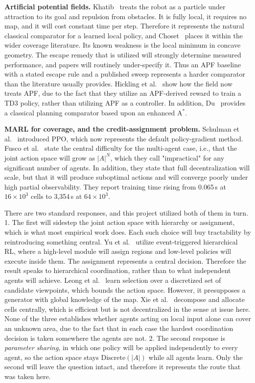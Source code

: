 \documentclass[a4paper, 10pt, conference]{ieeeconf}
\begin{document}
\textbf{Artificial potential fields.} Khatib~\cite{khatib1986} treats
the robot as a particle under attraction to its goal and repulsion
from obstacles. It is fully local, it requires no map, and it will
cost constant time per step. Therefore it represents the natural
classical comparator for a learned local policy, and
Choset~\cite{choset2001} places it within the wider coverage
literature. Its known weakness is the local minimum in concave
geometry. The escape remedy that is utilized will strongly determine
measured performance, and papers will routinely under-specify it. Thus
an APF baseline with a stated escape rule and a published sweep
represents a harder comparator than the literature usually provides.
Hickling et al.~\cite{hickling2025} show how the field now treats APF,
due to the fact that they utilize an APF-derived reward to train a TD3
policy, rather than utilizing APF as a controller. In addition,
Du~\cite{du2023} provides a classical planning comparator based upon
an enhanced A$^*$.

\textbf{MARL for coverage, and the credit-assignment problem.}
Schulman et al.~\cite{schulman2017} introduced PPO, which now
represents the default policy-gradient method. Fusco et
al.~\cite{fusco2025} state the central difficulty for the multi-agent
case, i.e., that the joint action space will grow as $|A|^N$, which
they call "impractical" for any significant number of agents. In
addition, they state that full decentralization will scale, but that
it will produce suboptimal actions and will converge poorly under high
partial observability. They report training time rising from 0.065\,s
at $16\times10^3$ cells to 3{,}354\,s at $64\times10^3$.

There are two standard responses, and this project utilized both of
them in turn. 1. The first will sidestep the joint action space with
hierarchy or assignment, which is what most empirical work does. Each
such choice will buy tractability by reintroducing something central.
Yu et al.~\cite{yu2025} utilize event-triggered hierarchical RL, where
a high-level module will assign regions and low-level policies will
execute inside them. The assignment represents a central decision.
Therefore the result speaks to hierarchical coordination, rather than
to what independent agents will achieve. Leong et al.~\cite{leong2024}
learn selection over a discretized set of candidate viewpoints, which
bounds the action space. However, it presupposes a generator with
global knowledge of the map. Xie et al.~\cite{xie2025} decompose and
allocate cells centrally, which is efficient but is not decentralized
in the sense at issue here. None of the three establishes whether
agents acting on local input alone can cover an unknown area, due to
the fact that in each case the hardest coordination decision is taken
somewhere the agents are not. 2. The second response is
\emph{parameter sharing}, in which one policy will be applied
independently to every agent, so the action space stays
$\text{Discrete}(|A|)$ while all agents learn. Only the second will
leave the question intact, and therefore it represents the route that
was taken here.
\end{document}
